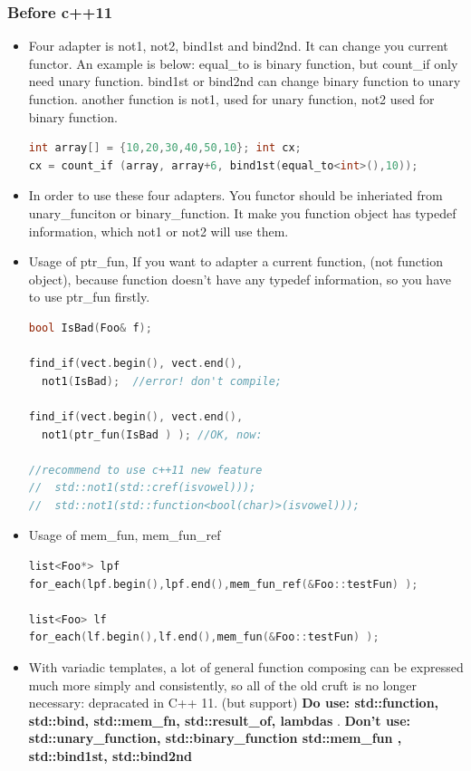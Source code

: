 \documentclass[a4paper,11pt,twoside]{book}
\begin{document}
\subsubsection{Before c++11}
\begin{itemize}
\item Four adapter is not1, not2, bind1st and bind2nd. It can change you current functor. An example is below: equal\_to is binary function, but count\_if only need unary function.  bind1st or bind2nd can change binary function to unary function.  another function is not1, used for unary function, not2 used for binary function.
\begin{lstlisting}[frame=single, language=c++]
int array[] = {10,20,30,40,50,10}; int cx;
cx = count_if (array, array+6, bind1st(equal_to<int>(),10));
\end{lstlisting}

\item In order to use these four adapters. You functor should be inheriated from unary\_funciton or binary\_function. It make you function object has typedef information, which not1 or not2 will use them.

\item Usage of ptr\_fun, If you want to adapter a current function, (not function object), because function doesn't have any typedef information, so you have to use ptr\_fun firstly.
\begin{lstlisting}[frame=single, language=c++]
bool IsBad(Foo& f);

find_if(vect.begin(), vect.end(),
  not1(IsBad);  //error! don't compile;

find_if(vect.begin(), vect.end(),
  not1(ptr_fun(IsBad ) ); //OK, now:

//recommend to use c++11 new feature
//  std::not1(std::cref(isvowel)));
//  std::not1(std::function<bool(char)>(isvowel)));
\end{lstlisting}


\item Usage of mem\_fun, mem\_fun\_ref
\begin{lstlisting}[frame=single, language=c++]
list<Foo*> lpf
for_each(lpf.begin(),lpf.end(),mem_fun_ref(&Foo::testFun) );

list<Foo> lf
for_each(lf.begin(),lf.end(),mem_fun(&Foo::testFun) );
\end{lstlisting}

\item With variadic templates, a lot of general function composing can be expressed much more simply and consistently, so all of the old cruft is no longer necessary: depracated in C++ 11. (but support)
\textbf{Do use: std::function, std::bind, std::mem\_fn, std::result\_of, lambdas }.  \textbf{Don't use: std::unary\_function, std::binary\_function
std::mem\_fun , std::bind1st, std::bind2nd}

\end{itemize}
\end{document}
